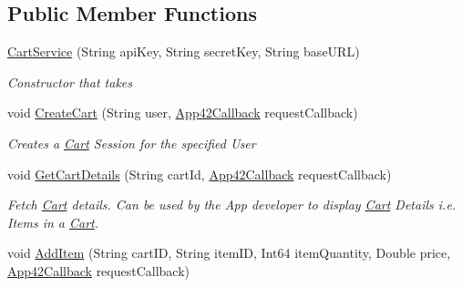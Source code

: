 \subsection*{Public Member Functions}
\begin{DoxyCompactItemize}
\item 
\hyperlink{classcom_1_1shephertz_1_1app42_1_1paas_1_1sdk_1_1windows_1_1shopping_1_1_cart_service_ab1a11ffda7426988fcbca4656fb937c7}{Cart\+Service} (String api\+Key, String secret\+Key, String base\+U\+R\+L)
\begin{DoxyCompactList}\small\item\em Constructor that takes \end{DoxyCompactList}\item 
void \hyperlink{classcom_1_1shephertz_1_1app42_1_1paas_1_1sdk_1_1windows_1_1shopping_1_1_cart_service_a704c1f67fb30c9ad75ca71b644b14445}{Create\+Cart} (String user, \hyperlink{interfacecom_1_1shephertz_1_1app42_1_1paas_1_1sdk_1_1windows_1_1_app42_callback}{App42\+Callback} request\+Callback)
\begin{DoxyCompactList}\small\item\em Creates a \hyperlink{classcom_1_1shephertz_1_1app42_1_1paas_1_1sdk_1_1windows_1_1shopping_1_1_cart}{Cart} Session for the specified User \end{DoxyCompactList}\item 
void \hyperlink{classcom_1_1shephertz_1_1app42_1_1paas_1_1sdk_1_1windows_1_1shopping_1_1_cart_service_a3c92de8f6e5350e5680a85e216d4d118}{Get\+Cart\+Details} (String cart\+Id, \hyperlink{interfacecom_1_1shephertz_1_1app42_1_1paas_1_1sdk_1_1windows_1_1_app42_callback}{App42\+Callback} request\+Callback)
\begin{DoxyCompactList}\small\item\em Fetch \hyperlink{classcom_1_1shephertz_1_1app42_1_1paas_1_1sdk_1_1windows_1_1shopping_1_1_cart}{Cart} details. Can be used by the App developer to display \hyperlink{classcom_1_1shephertz_1_1app42_1_1paas_1_1sdk_1_1windows_1_1shopping_1_1_cart}{Cart} Details i.\+e. Items in a \hyperlink{classcom_1_1shephertz_1_1app42_1_1paas_1_1sdk_1_1windows_1_1shopping_1_1_cart}{Cart}. \end{DoxyCompactList}\item 
void \hyperlink{classcom_1_1shephertz_1_1app42_1_1paas_1_1sdk_1_1windows_1_1shopping_1_1_cart_service_a2a89699c83d0d104da5a44e3db2a6dfc}{Add\+Item} (String cart\+I\+D, String item\+I\+D, Int64 item\+Quantity, Double price, \hyperlink{interfacecom_1_1shephertz_1_1app42_1_1paas_1_1sdk_1_1windows_1_1_app42_callback}{App42\+Callback} request\+Callback)

\end{DoxyCompactItemize}
